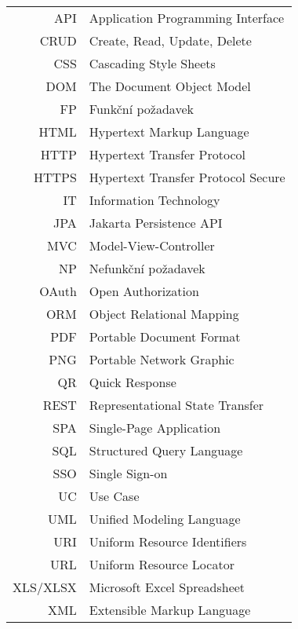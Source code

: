 \documentclass[czech,bachelor,oneside]{ctufit-thesis}
\begin{document}
\begin{tabular}{rl}
API & Application Programming Interface \\
CRUD & Create, Read, Update, Delete \\
CSS & Cascading Style Sheets \\
DOM & The Document Object Model \\
FP & Funkční požadavek \\
HTML & Hypertext Markup Language \\
HTTP & Hypertext Transfer Protocol \\
HTTPS & Hypertext Transfer Protocol Secure \\
IT & Information Technology \\
JPA & Jakarta Persistence API \\
MVC & Model-View-Controller \\
NP & Nefunkční požadavek \\
OAuth & Open Authorization \\
ORM & Object Relational Mapping \\
PDF & Portable Document Format \\
PNG & Portable Network Graphic \\
QR & Quick Response \\
REST & Representational State Transfer \\
SPA & Single-Page Application \\
SQL & Structured Query Language \\
SSO & Single Sign-on \\
UC & Use Case \\
UML & Unified Modeling Language \\
URI & Uniform Resource Identifiers \\
URL & Uniform Resource Locator \\
XLS/XLSX & Microsoft Excel Spreadsheet \\
XML & Extensible Markup Language \\
\end{tabular}
\resumeTOCentries
\mainmatter\mainmatterinit %


\appendix\appendixinit %


\backmatter %

\printbibliography %

\end{document}
